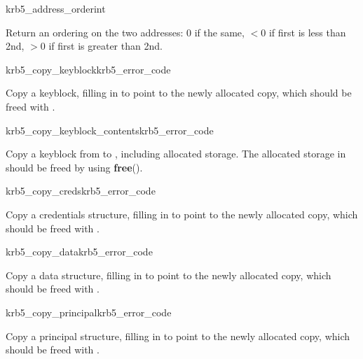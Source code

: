 \begin{funcdecl}{krb5_address_order}{int}{\funcin}
\end{funcdecl}

Return an ordering on the two addresses:  0 if the same,
$< 0$ if first is less than 2nd, $> 0$ if first is greater than 2nd.

\begin{funcdecl}{krb5_copy_keyblock}{krb5_error_code}{\funcin}
\funcout
{}
\end{funcdecl}

Copy a keyblock, filling in  to point to the newly
allocated copy, which should be freed with
. 

\begin{funcdecl}{krb5_copy_keyblock_contents}{krb5_error_code}{\funcin}
\funcout
{}
\end{funcdecl}

Copy a keyblock from  to , including
allocated storage.  The allocated storage in  should be
freed by using {\bf free}().

\begin{funcdecl}{krb5_copy_creds}{krb5_error_code}{\funcin}
\funcout
{}
\end{funcdecl}

Copy a credentials structure, filling in  to point
to the newly allocated copy, which should be freed with
.

\begin{funcdecl}{krb5_copy_data}{krb5_error_code}{\funcin}
\funcout
{}
\end{funcdecl}

Copy a data structure, filling in  to point to the
newly allocated copy, which should be freed with .

\begin{funcdecl}{krb5_copy_principal}{krb5_error_code}{\funcin}
\funcout
{}
\end{funcdecl}
Copy a principal structure, filling in  to point to
the newly allocated copy, which should be freed with
.

